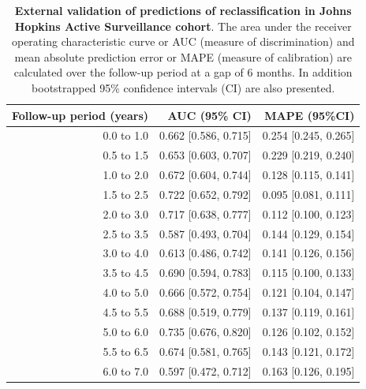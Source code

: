 \begin{table}[!htb]
\small\sf\centering
\caption{\textbf{External validation of predictions of reclassification in Johns Hopkins Active Surveillance cohort}. The area under the receiver operating characteristic curve or AUC (measure of discrimination) and mean absolute prediction error or MAPE (measure of calibration) are calculated over the follow-up period at a gap of 6 months. In addition bootstrapped 95\% confidence intervals (CI) are also presented.}
\label{tab:AUC_PE_JHAS}
\begin{tabular}{r|r|r}
\hline
\hline
Follow-up period (years) & AUC (95\% CI) & MAPE (95\%CI)\\ 
\hline
0.0 to 1.0 & 0.662 [0.586, 0.715] & 0.254 [0.245, 0.265]\\
0.5 to 1.5 & 0.653 [0.603, 0.707] & 0.229 [0.219, 0.240]\\
1.0 to 2.0 & 0.672 [0.604, 0.744] & 0.128 [0.115, 0.141]\\
1.5 to 2.5 & 0.722 [0.652, 0.792] & 0.095 [0.081, 0.111]\\
2.0 to 3.0 & 0.717 [0.638, 0.777] & 0.112 [0.100, 0.123]\\
2.5 to 3.5 & 0.587 [0.493, 0.704] & 0.144 [0.129, 0.154]\\
3.0 to 4.0 & 0.613 [0.486, 0.742] & 0.141 [0.126, 0.156]\\
3.5 to 4.5 & 0.690 [0.594, 0.783] & 0.115 [0.100, 0.133]\\
4.0 to 5.0 & 0.666 [0.572, 0.754] & 0.121 [0.104, 0.147]\\
4.5 to 5.5 & 0.688 [0.519, 0.779] & 0.137 [0.119, 0.161]\\
5.0 to 6.0 & 0.735 [0.676, 0.820] & 0.126 [0.102, 0.152]\\
5.5 to 6.5 & 0.674 [0.581, 0.765] & 0.143 [0.121, 0.172]\\
6.0 to 7.0 & 0.597 [0.472, 0.712] & 0.163 [0.126, 0.195]\\
\hline
\end{tabular}	
\end{table}

